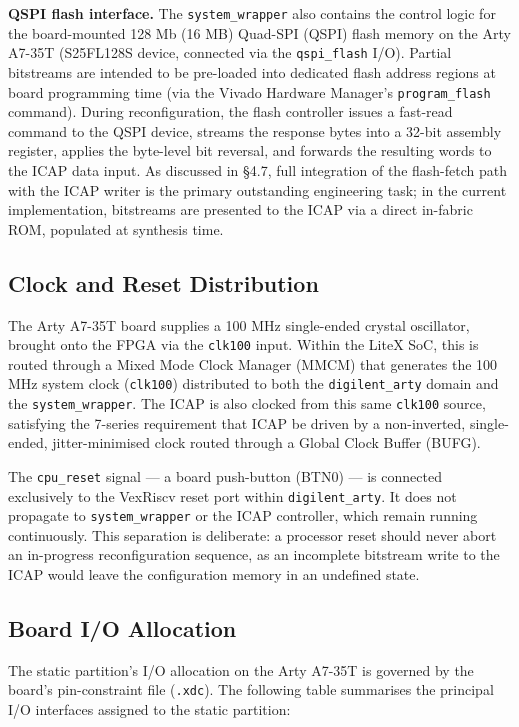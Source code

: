\textbf{QSPI flash interface.} The \texttt{system\_wrapper} also contains the control logic for the board-mounted 128 Mb (16 MB) Quad-SPI (QSPI) flash memory on the Arty A7-35T (S25FL128S device, connected via the \texttt{qspi\_flash} I/O). Partial bitstreams are intended to be pre-loaded into dedicated flash address regions at board programming time (via the Vivado Hardware Manager's \texttt{program\_flash} command). During reconfiguration, the flash controller issues a fast-read command to the QSPI device, streams the response bytes into a 32-bit assembly register, applies the byte-level bit reversal, and forwards the resulting words to the ICAP data input. As discussed in §4.7, full integration of the flash-fetch path with the ICAP writer is the primary outstanding engineering task; in the current implementation, bitstreams are presented to the ICAP via a direct in-fabric ROM, populated at synthesis time.

\subsection{Clock and Reset Distribution}

The Arty A7-35T board supplies a 100 MHz single-ended crystal oscillator, brought onto the FPGA via the \texttt{clk100} input. Within the LiteX SoC, this is routed through a Mixed Mode Clock Manager (MMCM) that generates the 100 MHz system clock (\texttt{clk100}) distributed to both the \texttt{digilent\_arty} domain and the \texttt{system\_wrapper}. The ICAP is also clocked from this same \texttt{clk100} source, satisfying the 7-series requirement that ICAP be driven by a non-inverted, single-ended, jitter-minimised clock routed through a Global Clock Buffer (BUFG).

The \texttt{cpu\_reset} signal — a board push-button (BTN0) — is connected exclusively to the VexRiscv reset port within \texttt{digilent\_arty}. It does not propagate to \texttt{system\_wrapper} or the ICAP controller, which remain running continuously. This separation is deliberate: a processor reset should never abort an in-progress reconfiguration sequence, as an incomplete bitstream write to the ICAP would leave the configuration memory in an undefined state.

\subsection{Board I/O Allocation}

The static partition's I/O allocation on the Arty A7-35T is governed by the board's pin-constraint file (\texttt{.xdc}). The following table summarises the principal I/O interfaces assigned to the static partition:

